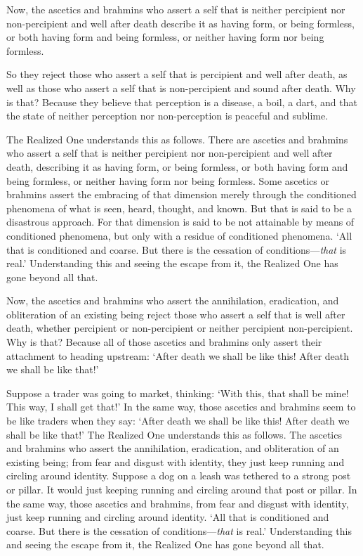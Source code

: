 \documentclass[12pt,openany]{book}%
\begin{document}
Now, the ascetics and brahmins who assert a self that is neither percipient nor non-percipient and well after death describe it as having form, or being formless, or both having form and being formless, or neither having form nor being formless. 

So they reject those who assert a self that is percipient and well after death, as well as those who assert a self that is non-percipient and sound after death. Why is that? Because they believe that perception is a disease, a boil, a dart, and that the state of neither perception nor non-perception is peaceful and sublime. 

The Realized One understands this as follows. There are ascetics and brahmins who assert a self that is neither percipient nor non-percipient and well after death, describing it as having form, or being formless, or both having form and being formless, or neither having form nor being formless. Some ascetics or brahmins assert the embracing of that dimension merely through the conditioned phenomena of what is seen, heard, thought, and known. But that is said to be a disastrous approach. For that dimension is said to be not attainable by means of conditioned phenomena, but only with a residue of conditioned phenomena. ‘All that is conditioned and coarse. But there is the cessation of conditions—\emph{that} is real.’ Understanding this and seeing the escape from it, the Realized One has gone beyond all that. 

Now, the ascetics and brahmins who assert the annihilation, eradication, and obliteration of an existing being reject those who assert a self that is well after death, whether percipient or non-percipient or neither percipient non-percipient. Why is that? Because all of those ascetics and brahmins only assert their attachment to heading upstream: ‘After death we shall be like this! After death we shall be like that!’ 

Suppose a trader was going to market, thinking: ‘With this, that shall be mine! This way, I shall get that!’ In the same way, those ascetics and brahmins seem to be like traders when they say: ‘After death we shall be like this! After death we shall be like that!’ The Realized One understands this as follows. The ascetics and brahmins who assert the annihilation, eradication, and obliteration of an existing being; from fear and disgust with identity, they just keep running and circling around identity. Suppose a dog on a leash was tethered to a strong post or pillar. It would just keeping running and circling around that post or pillar. In the same way, those ascetics and brahmins, from fear and disgust with identity, just keep running and circling around identity. ‘All that is conditioned and coarse. But there is the cessation of conditions—\emph{that} is real.’ Understanding this and seeing the escape from it, the Realized One has gone beyond all that. 
\end{document}

